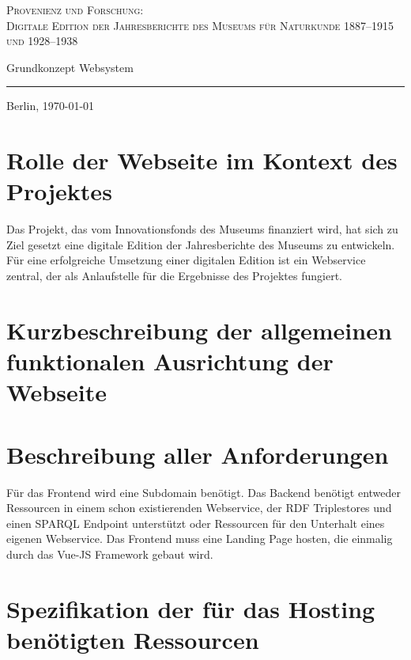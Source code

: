 \documentclass[11pt]{article}
\begin{document}
{ \centering
    \begin{spacing}{1.8}
        {\scshape \Large Provenienz und Forschung:\\
        Digitale Edition der Jahresberichte des Museums für Naturkunde 1887--1915 und 1928--1938}
    \end{spacing}
    
    {
        
        \bigskip%
        \huge Grundkonzept Websystem\par
        \medskip
        \rule{0.07\textwidth}{0.7pt}
    }\par
    
    Berlin, \today

}\par


\bigskip
\tableofcontents
\clearpage

\section{Rolle der Webseite im Kontext des Projektes}
Das Projekt, das vom Innovationsfonds des Museums finanziert wird, hat sich zu Ziel gesetzt eine digitale Edition der Jahresberichte des Museums zu entwickeln. Für eine erfolgreiche Umsetzung einer digitalen Edition ist ein Webservice zentral, der als Anlaufstelle für die Ergebnisse des Projektes fungiert. 


\section{Kurzbeschreibung der allgemeinen funktionalen Ausrichtung der Webseite}

\section{Beschreibung aller Anforderungen}
Für das Frontend wird eine Subdomain benötigt. Das Backend benötigt entweder Ressourcen in einem schon existierenden Webservice, der RDF Triplestores und einen SPARQL Endpoint unterstützt oder Ressourcen für den Unterhalt eines eigenen Webservice. Das Frontend muss eine Landing Page hosten, die einmalig durch das Vue-JS Framework gebaut wird.

\section{Spezifikation der für das Hosting benötigten Ressourcen}
\end{document}
